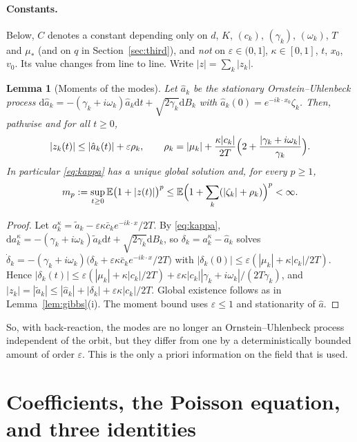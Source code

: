\documentclass[11pt]{article}
\newcommand{\dd}{\mathrm{d}}
\newcommand{\E}{\mathbb{E}}
\newcommand{\eps}{\varepsilon}
\newtheorem{lemma}[theorem]{Lemma}
\theoremstyle{remark}
\begin{document}
\paragraph{Constants.} Below, $C$ denotes a constant depending only on $d$,
$K$, $(c_k)$, $(\gamma_k)$, $(\omega_k)$, $T$ and $\mu_*$ (and on $q$ in
Section~\ref{sec:third}), and \emph{not} on $\eps\in(0,1]$,
$\kappa\in[0,1]$, $t$, $x_0$, $v_0$. Its value changes from line to line.
Write $|z|=\sum_k|z_k|$.

\begin{lemma}[Moments of the modes]\label{lem:mom}
Let $\hat a_k$ be the stationary Ornstein--Uhlenbeck process
$\dd\hat a_k=-(\gamma_k+i\omega_k)\hat a_k\dd t+\sqrt{2\gamma_k}\dd B_k$
with $\hat a_k(0)=e^{-ik\cdot x_0}\zeta_k$. Then, pathwise and for all
$t\ge0$,
\[
  |z_k(t)|\le|\hat a_k(t)|+\eps\rho_k,\qquad
  \rho_k=|\mu_k|+\frac{\kappa|c_k|}{2T}\Bigl(2+\frac{|\gamma_k+i\omega_k|}{\gamma_k}\Bigr).
\]
In particular \eqref{eq:kappa} has a unique global solution and, for every
$p\ge1$,
\[
  m_p:=\sup_{t\ge0}\E\bigl(1+|z(t)|\bigr)^p
  \le\E\Bigl(1+\sum_k(|\zeta_k|+\rho_k)\Bigr)^p<\infty .
\]
\end{lemma}

\begin{proof}
Let $a^\kappa_k=\tilde a_k-\eps\kappa\bar c_ke^{-ik\cdot x}/2T$. By
\eqref{eq:kappa},
$\dd a^\kappa_k=-(\gamma_k+i\omega_k)\tilde a_k\dd t+\sqrt{2\gamma_k}\dd B_k$,
so $\delta_k=a_k^\kappa-\hat a_k$ solves
$\dot\delta_k=-(\gamma_k+i\omega_k)\bigl(\delta_k
+\eps\kappa\bar c_ke^{-ik\cdot x}/2T\bigr)$ with
$|\delta_k(0)|\le\eps(|\mu_k|+\kappa|c_k|/2T)$. Hence
$|\delta_k(t)|\le\eps(|\mu_k|+\kappa|c_k|/2T)
+\eps\kappa|c_k||\gamma_k+i\omega_k|/(2T\gamma_k)$, and
$|z_k|=|\tilde a_k|\le|\hat a_k|+|\delta_k|+\eps\kappa|c_k|/2T$. Global
existence follows as in Lemma~\ref{lem:gibbs}(i). The moment bound uses
$\eps\le1$ and stationarity of $\hat a$.
\end{proof}

So, with back-reaction, the modes are no longer an Ornstein--Uhlenbeck
process independent of the orbit, but they differ from one by a
deterministically bounded amount of order $\eps$. This is the only a priori
information on the field that is used.

\section{Coefficients, the Poisson equation, and three identities}
\end{document}

